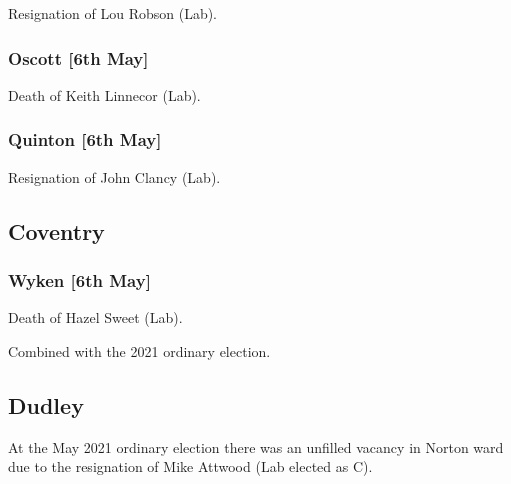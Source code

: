 \documentclass[a4paper,openany]{book}
\begin{document}
\begin{resultsiii}

Resignation of Lou Robson (Lab).

\subsubsection*{Oscott \hspace*{\fill}\nolinebreak[1]%
	\enspace\hspace*{\fill}
	[6th May]}


Death of Keith Linnecor (Lab).

\subsubsection*{Quinton \hspace*{\fill}\nolinebreak[1]%
	\enspace\hspace*{\fill}
	[6th May]}


Resignation of John Clancy (Lab).

\subsection*{Coventry}

\subsubsection*{Wyken \hspace*{\fill}\nolinebreak[1]%
	\enspace\hspace*{\fill}
	[6th May]}


Death of Hazel Sweet (Lab).

Combined with the 2021 ordinary election.

\subsection*{Dudley}

At the May 2021 ordinary election there was an unfilled vacancy in Norton ward due to the resignation of Mike Attwood (Lab elected as C).


\end{resultsiii}
\end{document}
